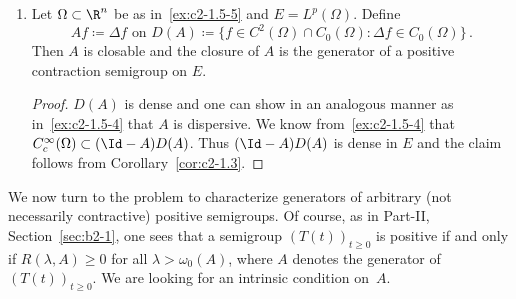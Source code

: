 \begin{examples}
\begin{enumerate}[\upshape (i), wide, labelindent=.25em]
Let $A$ be given by 
\[
Af = \Delta f\quad\text{on}\quad 
D(A) \coloneq \{f \in C^{2}(\Omega) \cap C_{0}(\Omega) \colon \Delta f \in C_{0}(\Omega)\}\,.
\]
Then $A$ is closable and the closure of\/ $A$ is the generator of a positive contraction semigroup.
\begin{proof}
$D(A)$ is clearly dense in $E$.
Moreover, one can show as in~\ref{ex:c2-1.5-3} that $A$ is dispersive.
It remains to prove that $(\Id - A)D(A)$ is dense in $E$.
The space $C_{c}^{\infty}(\Omega)$ of all infinitely differentiabele functions on $\Omega$ with compact support contained in $\Omega$ is dense in $E \cap C_{c}^{\infty}(\Omega)$.
We show that there exists $f \in D(A)$ satisfying $(\Id - A)f = g$.
Let $\bar{g} \colon \R^{n} \to \R$ be given by 
\[
\bar{g}(x) \coloneq 
\left\{
\begin{array}{cl}
g(x) & \text{ if } x \in \Omega\ \\
0 & \text{ if } x \notin \Omega\ \\
\end{array}
\right.
\]
Then $\bar{g} \in \mathcal{S}(\R^n)$.
By  Eq.~, there exists $\bar{f} \in \mathcal{S}(\R^n)$ such that $\bar{f} - \Delta\bar{f} = \bar{g}$.
Consider the function $b \in C(\partial\Omega)$, given by, $b(x) = \bar{f}(x)$ for all $x \in \partial\Omega$.
Then by our hypothesis there exists $u \in C(\overline{\Omega}) \cap C^{2}(\Omega)$ satisfying  Eq.~.
Let 
\[
f(x) = \bar{f}(x) - u(x) \text{ for } x \in \Omega\,.
\]
Then $f \in C^{2}(\Omega) \cap C(\Omega)$ and 
\[
(f - \Delta f)(x) = g(x) \text{ for } x \in \Omega\,.
\]
Thus $\Delta f = f - g$ vanishes on $\partial\Omega$.
Hence $f \in D(A)$ and $f - Af = g$.
\end{proof}
\item \label{ex:c2-1.5_6}   
Let $\Omega \subset \R^{n}$ be as in~\ref{ex:c2-1.5-5}   and $E = L^{p}(\Omega)$.
Define 
\[ 
Af \coloneq \Delta f \text{ on } D(A) \coloneq \{f \in C^{2}(\Omega) \cap C_{0}(\Omega) \colon \Delta f \in C_{0}(\Omega)\}\,.
\]
Then $A$ is closable and the closure of\/ $A$ is the generator of a positive contraction semigroup on $E$.
\begin{proof}
$D(A)$ is dense and one can show in an analogous manner as in~\ref{ex:c2-1.5-4}   that $A$ is dispersive.
We know from~\ref{ex:c2-1.5-4}   that $C_{c}^{\infty}(\Omega) \subset (\Id - A)D(A)$.
Thus $(\Id - A)D(A)$ is dense in $E$ and the claim follows from Corollary~\ref{cor:c2-1.3}.
\end{proof}
\end{enumerate}
\end{examples}
We now turn to the problem to characterize generators of arbitrary (not necessarily contractive) positive semigroups.
Of course, as in Part-II, Section~\ref{sec:b2-1}, 
one sees that a semigroup $(T(t))_{t \geq 0}$ is positive if and only if\/ $R(\lambda,A) \geq 0$ for all $\lambda > \omega_{0}(A)$, where $A$ denotes the generator of\/ $(T(t))_{t \geq 0}$.
We are looking for an intrinsic condition on~$A$.

